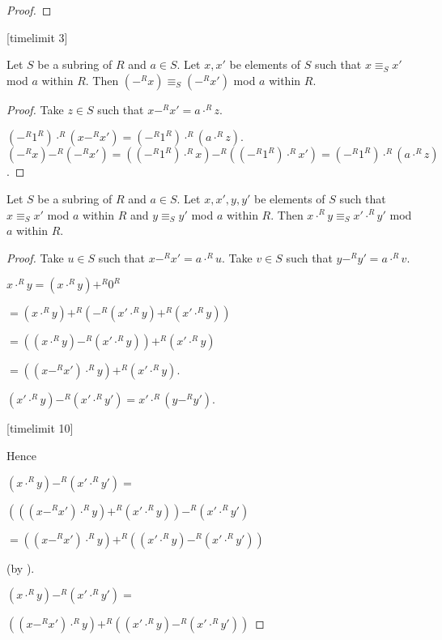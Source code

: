 \documentclass[11pt]{article}
\begin{document}
\begin{forthel}
\begin{proof}
\end{proof}
[timelimit 3]

\begin{lemma}
Let $S$ be a subring of $R$ and $a \in S$.
Let $x,x'$ be elements of $S$ such that
$x \equiv_{S} x'$ mod $a$ within $R$. 
Then $(-^{R}x) \equiv_{S} (-^{R}x')$ mod $a$ within $R$.
\end{lemma}
\begin{proof}
Take $z \in S$ such that $x -^{R} x' = a \cdot^{R} z$.

$(-^{R} 1^{R}) \cdot^{R} (x -^{R} x') = (-^{R} 1^{R}) \cdot^{R} (a \cdot^{R} z)$.
$(-^{R}x) -^{R} (-^{R}x') =
((-^{R} 1^{R}) \cdot^{R} x) -^{R} ((-^{R} 1^{R}) \cdot^{R} x') =
(-^{R} 1^{R}) \cdot^{R} (a \cdot^{R} z)$.
\end{proof}

\begin{lemma}
Let $S$ be a subring of $R$ and $a \in S$.
Let $x,x',y,y'$ be elements of $S$ such that
$x \equiv_{S} x'$ mod $a$ within $R$
and $y \equiv_{S} y'$ mod $a$ within $R$. 
Then $x \cdot^{R} y \equiv_{S} x' \cdot^{R} y'$ mod $a$ within $R$.
\end{lemma}
\begin{proof}
Take $u \in S$ such that $x -^{R} x' = a \cdot^{R} u$.
Take $v \in S$ such that $y -^{R} y' = a \cdot^{R} v$.

$x \cdot^{R} y = (x \cdot^{R} y) +^{R} 0^{R}$

$= (x \cdot^{R} y) +^{R} (-^{R} (x' \cdot^{R} y) +^{R} (x' \cdot^{R} y))$

$= ((x \cdot^{R} y) -^{R} (x' \cdot^{R} y)) +^{R} (x' \cdot^{R} y)$

$= ((x -^{R} x') \cdot^{R} y) +^{R} (x' \cdot^{R} y)$.


$(x' \cdot^{R} y) -^{R} (x' \cdot^{R} y') = x' \cdot^{R} (y -^{R} y')$.

[timelimit 10]

Hence

$(x \cdot^{R} y) -^{R} (x' \cdot^{R} y') = $
 
$ (((x -^{R} x') \cdot^{R} y) +^{R} (x' \cdot^{R} y)) -^{R} (x' \cdot^{R} y')$ 

$ = ((x -^{R} x') \cdot^{R} y) +^{R} ((x' \cdot^{R} y) -^{R} (x' \cdot^{R} y'))$

(by ).

$(x \cdot^{R} y) -^{R} (x' \cdot^{R} y') = $

$((x -^{R} x') \cdot^{R} y) +^{R} ((x' \cdot^{R} y) -^{R} (x' \cdot^{R} y'))$ 


\end{proof}
\end{forthel}
\end{document}
